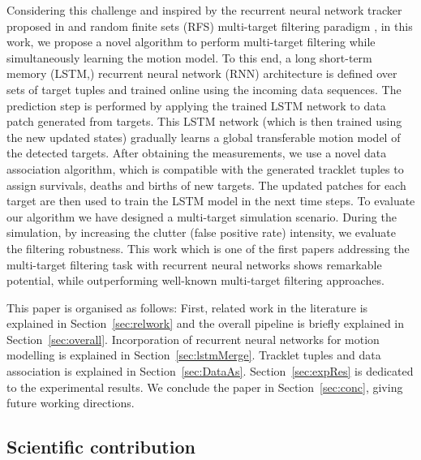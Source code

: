 \documentclass[runningheads]{llncs}
\begin{document}
Considering this challenge and inspired by the recurrent neural network tracker proposed in \cite{Milan:2017} and random finite sets (RFS) multi-target filtering paradigm \cite{Mahler:2003,Mahler:2007,Vo:2006}, in this work, we propose a novel algorithm to perform multi-target filtering while simultaneously learning the motion model. To this end, a long short-term memory (LSTM,{\cite{hochreiter1997}}) recurrent neural network (RNN) architecture is defined over sets of target tuples and trained {online} using the incoming data sequences. The prediction step is performed by applying the trained LSTM network to data patch generated from targets. This LSTM network (which is then trained using the new updated states) gradually learns a global transferable motion model of the detected targets.
After obtaining the measurements, we use a novel data association algorithm, which is compatible with the generated tracklet tuples to assign survivals, deaths and births of new targets. The updated patches for each target are then used to train the LSTM model in the next time steps.
To evaluate our algorithm we have designed a multi-target simulation scenario. During the simulation, by increasing the clutter (false positive rate) intensity, we evaluate the filtering robustness. 
This work which is one of the first papers addressing the multi-target filtering task with recurrent neural networks shows remarkable potential, while outperforming well-known multi-target filtering approaches.

This paper is organised as follows: First, related work in the literature is explained in Section~\ref{sec:relwork} and the overall pipeline is briefly explained in Section~\ref{sec:overall}. Incorporation of recurrent neural networks for motion modelling is explained in Section~\ref{sec:lstmMerge}. Tracklet tuples and data association is explained in Section~\ref{sec:DataAs}. Section~\ref{sec:expRes} is dedicated to the experimental results. We conclude the paper in Section~\ref{sec:conc}, giving future working directions.

\subsection{Scientific contribution}
\end{document}
